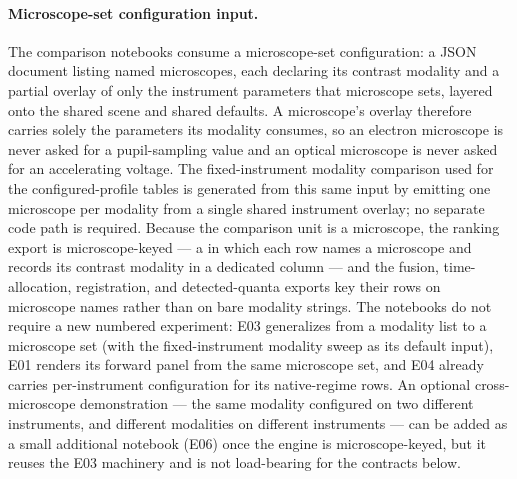 \paragraph{Microscope-set configuration input.}
The comparison notebooks consume a microscope-set configuration: a JSON document listing named microscopes, each declaring its contrast modality and a partial overlay of only the instrument parameters that microscope sets, layered onto the shared scene and shared defaults. A microscope's overlay therefore carries solely the parameters its modality consumes, so an electron microscope is never asked for a pupil-sampling value and an optical microscope is never asked for an accelerating voltage. The fixed-instrument modality comparison used for the configured-profile tables is generated from this same input by emitting one microscope per modality from a single shared instrument overlay; no separate code path is required. Because the comparison unit is a microscope, the ranking export is microscope-keyed --- a  in which each row names a microscope and records its contrast modality in a dedicated column --- and the fusion, time-allocation, registration, and detected-quanta exports key their rows on microscope names rather than on bare modality strings. The notebooks do not require a new numbered experiment: E03 generalizes from a modality list to a microscope set (with the fixed-instrument modality sweep as its default input), E01 renders its forward panel from the same microscope set, and E04 already carries per-instrument configuration for its native-regime rows. An optional cross-microscope demonstration --- the same modality configured on two different instruments, and different modalities on different instruments --- can be added as a small additional notebook (E06) once the engine is microscope-keyed, but it reuses the E03 machinery and is not load-bearing for the contracts below.

